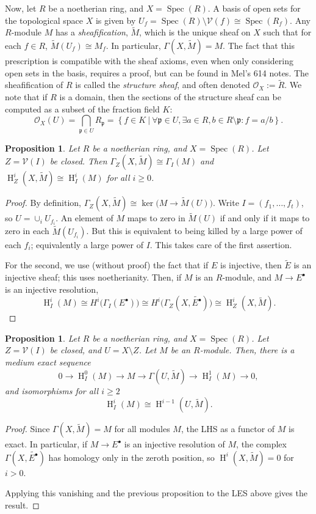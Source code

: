 \documentclass[11pt]{book}
\newtheorem{proposition}[theorem]{Proposition}
\numberwithin{equation}{section}
\numberwithin{theorem}{chapter}
\theoremstyle{definition}
\newtheorem*{basic properties}{Basic Properties}
\newtheorem*{Important Remark}{Important Remark}
\theoremstyle{remark}
\newcommand{\V}{\mathcal{V}}
\newcommand{\p}{\mathfrak{p}}
\newcommand{\Spec}{\operatorname{Spec}}
\renewcommand{\ker}{\operatorname{ker}}
\renewcommand{\H}{\operatorname{H}}
\begin{document}
Now, let $R$ be a noetherian ring, and $X=\Spec(R)$. A basis of open sets for the topological space $X$ is given by $U_f=\Spec(R)\setminus \V(f)\cong \Spec(R_f)$. Any $R$-module $M$ has a \emph{sheafification}, $\widetilde{M}$, which is the unique sheaf on $X$ such that for each $f\in R$, $\widetilde{M}(U_f)\cong M_f$. In particular, $\Gamma(X,\widetilde{M})=M$. The fact that this prescription is compatible with the sheaf axioms, even when only considering open sets in the basis, requires a proof, but can be found in Mel's 614 notes. The sheafification of $R$ is called the \emph{structure sheaf}, and often denoted $\mathcal{O}_X:= \widetilde{R}$. We note that if $R$ is a domain, then the sections of the structure sheaf can be computed as a subset of the fraction field $K$: 
\[ \mathcal{O}_X(U)=\bigcap_{\p\in U} R_\p = \left\{ f\in K \ | \ \forall \p \in U, \exists a\in R, b\in R\setminus \p : f=a/b\right\}.\]

\begin{proposition}
	Let $R$ be a noetherian ring, and $X=\Spec(R)$. Let $Z=\V(I)$ be closed. Then $\Gamma_{Z}(X,\widetilde{M})\cong \Gamma_I(M)$ and $\H^i_{Z}(X,\widetilde{M})\cong \H^i_I(M)$ for all $i\geq 0$.
\end{proposition}
\begin{proof}
	By definition, $\Gamma_{Z}(X,\widetilde{M})\cong \ker\big( M \to \widetilde{M}(U) \big)$. Write $I=(f_1,\dots,f_t)$, so $U=\cup_i U_{f_i}$. An element of $M$ maps to zero in $\widetilde{M}(U)$ if and only if it maps to zero in each $\widetilde{M}(U_{f_i})$. But this is equivalent to being killed by a large power of each $f_i$; equivalently a large power of $I$. This takes care of the first assertion.
	
	For the second, we use (without proof) the fact that if $E$ is injective, then $\widetilde{E}$ is an injective sheaf; this uses noetherianity. Then, if $M$ is an $R$-module, and $M\to E^{\bullet}$ is an injective resolution, 
	\[\H^i_I(M) \cong H^i\big(\Gamma_I(E^{\bullet})\big) \cong H^i\big( \Gamma_{Z}(X,\widetilde{E^{\bullet}}) \big) \cong \H^i_{Z}(X,\widetilde{M}).\]
	\end{proof}

\begin{proposition}
	Let $R$ be a noetherian ring, and $X=\Spec(R)$. Let $Z=\V(I)$ be closed, and $U=X\setminus Z$. Let $M$ be an $R$-module. Then, there is a medium exact sequence
	\[ 0\to \H^0_I(M) \to M \to \Gamma(U,\widetilde{M}) \to \H^1_I(M)\to 0, \]
	and isomorphisms for all $i\geq 2$
	\[ \H^{i}_I(M) \cong \H^{i-1}(U,\widetilde{M}).\]
\end{proposition}
\begin{proof}
Since $\Gamma(X,\widetilde{M})=M$ for all modules $M$, the LHS as a functor of $M$ is exact. In particular, if $M\to E^{\bullet}$ is an injective resolution of $M$, the complex $\Gamma(X,\widetilde{E^{\bullet}})$ has homology only in the zeroth position, so $\H^i(X,\widetilde{M})=0$ for $i>0$.

Applying this vanishing and the previous proposition to the LES above gives the result.
\end{proof}
\end{document}
